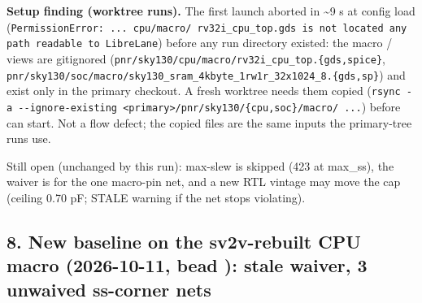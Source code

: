 \begin{record}
\textbf{Setup finding (worktree runs).} The first launch aborted in
\textasciitilde9 s at config load
(\texttt{PermissionError:\allowbreak{}\ .\allowbreak{}.\allowbreak{}.\allowbreak{}\ cpu/\allowbreak{}macro/\allowbreak{}\ rv32i\_\allowbreak{}cpu\_\allowbreak{}top.\allowbreak{}gds\ is\ not\ located\ any\ path\ readable\ to\ LibreLane})
before any run directory existed: the macro  /
 views are gitignored
(\texttt{pnr/\allowbreak{}sky130/\allowbreak{}cpu/\allowbreak{}macro/\allowbreak{}rv32i\_\allowbreak{}cpu\_\allowbreak{}top.\allowbreak{}\{gds,\allowbreak{}spice\}},
\texttt{pnr/\allowbreak{}sky130/\allowbreak{}soc/\allowbreak{}macro/\allowbreak{}sky130\_\allowbreak{}sram\_\allowbreak{}4kbyte\_\allowbreak{}1rw1r\_\allowbreak{}32x1024\_\allowbreak{}8.\allowbreak{}\{gds,\allowbreak{}sp\}})
and exist only in the primary checkout. A fresh worktree needs them
copied
(\texttt{rsync\ -\allowbreak{}a\ -\allowbreak{}-\allowbreak{}ignore-\allowbreak{}existing\ <primary>/\allowbreak{}pnr/\allowbreak{}sky130/\allowbreak{}\{cpu,\allowbreak{}soc\}/\allowbreak{}macro/\allowbreak{}\ .\allowbreak{}.\allowbreak{}.\allowbreak{}})
before  can start. Not a flow defect; the copied files are
the same inputs the primary-tree runs use.

Still open (unchanged by this run): max-slew is skipped (423 at
max\_ss), the waiver is for the one macro-pin net, and a new RTL vintage
may move the cap (ceiling 0.70 pF; STALE warning if the net stops
violating).

\end{record}

\subsection{\texorpdfstring{8. New baseline on the sv2v-rebuilt CPU
macro (2026-10-11, bead ): stale waiver, 3 unwaived ss-corner
nets}{8. New baseline on the sv2v-rebuilt CPU macro (2026-10-11, bead ): stale waiver, 3 unwaived ss-corner nets}}\label{cr:defect:sky130-slew-cap-e45j:8-new-baseline-on-the-sv2v-rebuilt-cpu-macro-2026-10-11-bead-dud4-stale-waiver-3-unwaived-ss-corner-nets}

